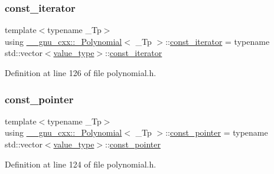 \subsubsection{\texorpdfstring{const\+\_\+iterator}{const\_iterator}}
{\footnotesize\ttfamily template$<$typename \+\_\+\+Tp$>$ \\
using \hyperlink{class____gnu__cxx_1_1__Polynomial}{\+\_\+\+\_\+gnu\+\_\+cxx\+::\+\_\+\+Polynomial}$<$ \+\_\+\+Tp $>$\+::\hyperlink{class____gnu__cxx_1_1__Polynomial_a96e4523cc2a834724fe4224f0800486b}{const\+\_\+iterator} =  typename std\+::vector$<$\hyperlink{class____gnu__cxx_1_1__Polynomial_a725563351f50e76084a7a016c06f8a53}{value\+\_\+type}$>$\+::\hyperlink{class____gnu__cxx_1_1__Polynomial_a96e4523cc2a834724fe4224f0800486b}{const\+\_\+iterator}}



Definition at line 126 of file polynomial.\+h.

\mbox{\label{class____gnu__cxx_1_1__Polynomial_aaf4c4bbd516b837df5fe70b3bda4e9af}} 
\subsubsection{\texorpdfstring{const\+\_\+pointer}{const\_pointer}}
{\footnotesize\ttfamily template$<$typename \+\_\+\+Tp$>$ \\
using \hyperlink{class____gnu__cxx_1_1__Polynomial}{\+\_\+\+\_\+gnu\+\_\+cxx\+::\+\_\+\+Polynomial}$<$ \+\_\+\+Tp $>$\+::\hyperlink{class____gnu__cxx_1_1__Polynomial_aaf4c4bbd516b837df5fe70b3bda4e9af}{const\+\_\+pointer} =  typename std\+::vector$<$\hyperlink{class____gnu__cxx_1_1__Polynomial_a725563351f50e76084a7a016c06f8a53}{value\+\_\+type}$>$\+::\hyperlink{class____gnu__cxx_1_1__Polynomial_aaf4c4bbd516b837df5fe70b3bda4e9af}{const\+\_\+pointer}}



Definition at line 124 of file polynomial.\+h.

\mbox{\label{class____gnu__cxx_1_1__Polynomial_a55e17774f3387e74adb57376d099cf16}} 
